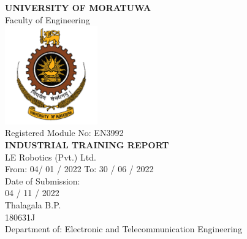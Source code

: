 \begin{titlepage}
\center %


\textbf{\large UNIVERSITY OF MORATUWA }\\[8mm]
{\large Faculty of Engineering}\\[1.5cm]
\includegraphics[width=0.3\textwidth]{figures/uomlogo}\\[1.5cm]


{\large Registered Module No: EN3992}\\[5mm]
\textbf{\large INDUSTRIAL TRAINING REPORT}\\[1cm]


{\large LE Robotics (Pvt.) Ltd.}\\[0.5cm]

{\large From: 04/ 01 / 2022 To: 30 / 06 / 2022}\\[1cm]

{\large Date of Submission:}\\[2mm]
{\large 04 / 11 / 2022} \\[1cm]

{\large Thalagala B.P.}\\[4mm]
{\large 180631J}\\[1cm]

{\large Department of: Electronic and Telecommunication Engineering}


\vfill %

\end{titlepage}